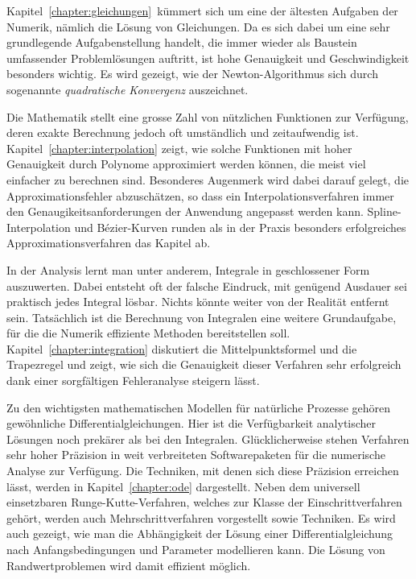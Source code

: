 Kapitel~\ref{chapter:gleichungen} kümmert sich um eine der ältesten
Aufgaben der Numerik, nämlich die Lösung von Gleichungen.
%
%
Da es sich dabei um eine sehr grundlegende Aufgabenstellung handelt,
die immer wieder als Baustein umfassender Problemlösungen auftritt,
ist hohe Genauigkeit und Geschwindigkeit besonders wichtig.
Es wird gezeigt, wie der Newton-Algorithmus sich durch sogenannte
{\em quadratische Konvergenz} auszeichnet.
%

Die Mathematik stellt eine grosse Zahl von nützlichen Funktionen zur
Verfügung, deren exakte Berechnung jedoch oft umständlich und
zeitaufwendig ist.
%
Kapitel~\ref{chapter:interpolation} zeigt, wie solche Funktionen
mit hoher Genauigkeit durch Polynome approximiert werden können,
die meist viel einfacher zu berechnen sind.
%
Besonderes Augenmerk wird dabei darauf gelegt, die Approximationsfehler
abzuschätzen, so dass ein Interpolationsverfahren immer den
Genaugikeitsanforderungen der Anwendung angepasst werden kann.
%
Spline-Interpolation und Bézier-Kurven runden als in der Praxis besonders
erfolgreiches Approximationsverfahren das Kapitel ab.
%
%

In der Analysis lernt man unter anderem, Integrale in geschlossener
Form auszuwerten.
%
Dabei entsteht oft der falsche Eindruck, mit genügend Ausdauer sei praktisch
jedes Integral lösbar.
Nichts könnte weiter von der Realität entfernt sein.
Tatsächlich ist die Berechnung von Integralen eine weitere Grundaufgabe,
für die die Numerik effiziente Methoden bereitstellen soll.
Kapitel~\ref{chapter:integration} diskutiert die Mittelpunktsformel und
die Trapezregel und zeigt, wie sich die Genauigkeit dieser Verfahren
sehr erfolgreich dank einer sorgfältigen Fehleranalyse steigern lässt.
%
%

Zu den wichtigsten mathematischen Modellen für natürliche Prozesse
gehören gewöhnliche Differentialgleichungen.
%
%
Hier ist die Verfügbarkeit analytischer Lösungen noch prekärer als
bei den Integralen.
%
%
Glücklicherweise stehen Verfahren sehr hoher Präzision in weit
verbreiteten Softwarepaketen für die numerische Analyse zur Verfügung.
%
Die Techniken, mit denen sich diese Präzision erreichen lässt,
werden in Kapitel~\ref{chapter:ode} dargestellt.
Neben dem universell einsetzbaren Runge-Kutte-Verfahren, welches zur
Klasse der Einschrittverfahren gehört, werden auch Mehrschrittverfahren
vorgestellt sowie Techniken.
%
%
%
Es wird auch gezeigt, wie man die Abhängigkeit der Lösung einer 
Differentialgleichung nach Anfangsbedingungen und Parameter modellieren
kann.
%
%
Die Lösung von Randwertproblemen wird damit effizient möglich.
%

